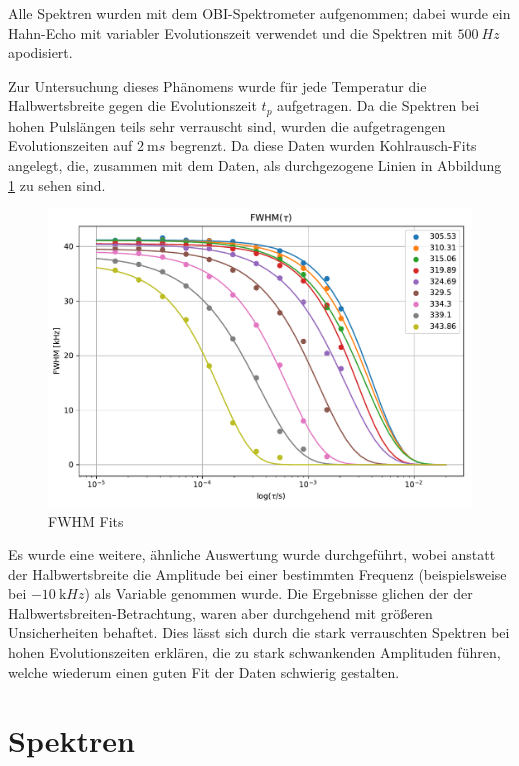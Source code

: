 Alle Spektren wurden mit dem OBI-Spektrometer aufgenommen; dabei wurde ein Hahn-Echo mit variabler Evolutionszeit verwendet und die Spektren mit $\SI{500}{Hz}$ apodisiert.

Zur Untersuchung dieses Phänomens wurde für jede Temperatur die Halbwertsbreite gegen die Evolutionszeit $t_p$ aufgetragen. Da die Spektren bei hohen Pulslängen teils sehr verrauscht sind, wurden die aufgetragengen Evolutionszeiten auf $\SI{2}{\milli s}$ begrenzt. Da diese Daten wurden Kohlrausch-Fits angelegt, die, zusammen mit dem Daten, als durchgezogene Linien in Abbildung \ref{fig:res:spekdyn_fits} zu sehen sind.
\begin{figure}
	\begin{center}
		\includegraphics[width=\textwidth]{graphics/plots/SPEKDYN/spekdyn_fits.pdf}
	\end{center}
	\caption{FWHM Fits} \label{fig:res:spekdyn_fits}
\end{figure}


Es wurde eine weitere, ähnliche Auswertung wurde durchgeführt, wobei anstatt der Halbwertsbreite die Amplitude bei einer bestimmten Frequenz (beispielsweise bei $\SI{-10}{\kilo Hz}$) als Variable genommen wurde. Die Ergebnisse glichen der der Halbwertsbreiten-Betrachtung, waren aber durchgehend mit größeren Unsicherheiten behaftet. Dies lässt sich durch die stark verrauschten Spektren bei hohen Evolutionszeiten erklären, die zu stark schwankenden Amplituden führen, welche wiederum einen guten Fit der Daten schwierig gestalten.





\section{Spektren} \label{section:res:spektren}

